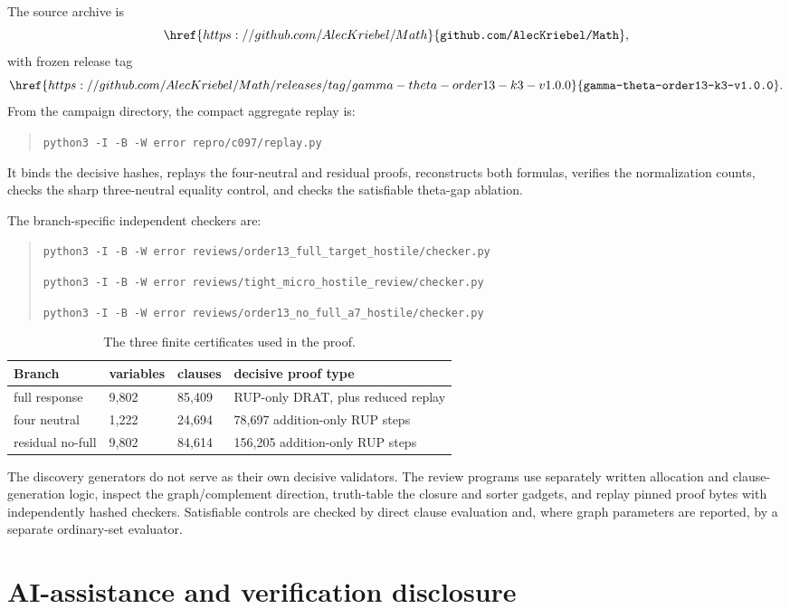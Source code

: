 \documentclass[11pt]{article}
\theoremstyle{definition}
\theoremstyle{remark}
\begin{document}
The source archive is
\[
\href{https://github.com/AlecKriebel/Math}
     {\texttt{github.com/AlecKriebel/Math}},
\]
with frozen release tag
\[
\href{https://github.com/AlecKriebel/Math/releases/tag/gamma-theta-order13-k3-v1.0.0}
     {\texttt{gamma-theta-order13-k3-v1.0.0}}.
\]
From the campaign directory, the compact aggregate replay is:
\begin{quote}
\small
\texttt{python3 -I -B -W error repro/c097/replay.py}
\end{quote}
It binds the decisive hashes, replays the four-neutral and residual proofs,
reconstructs both formulas, verifies the normalization counts, checks the
sharp three-neutral equality control, and checks the satisfiable
theta-gap ablation.

The branch-specific independent checkers are:
\begin{quote}
\small
\texttt{python3 -I -B -W error reviews/order13\_full\_target\_hostile/checker.py}

\texttt{python3 -I -B -W error reviews/tight\_micro\_hostile\_review/checker.py}

\texttt{python3 -I -B -W error reviews/order13\_no\_full\_a7\_hostile/checker.py}
\end{quote}

\begin{table}[ht]
\centering
\small
\begin{tabular}{llll}
\toprule
Branch & variables & clauses & decisive proof type\\
\midrule
full response & 9,802 & 85,409 & RUP-only DRAT, plus reduced replay\\
four neutral & 1,222 & 24,694 & 78,697 addition-only RUP steps\\
residual no-full & 9,802 & 84,614 & 156,205 addition-only RUP steps\\
\bottomrule
\end{tabular}
\caption{The three finite certificates used in the proof.}
\end{table}

The discovery generators do not serve as their own decisive validators.
The review programs use separately written allocation and clause-generation
logic, inspect the graph/complement direction, truth-table the closure and
sorter gadgets, and replay pinned proof bytes with independently hashed
checkers.  Satisfiable controls are checked by direct clause evaluation and,
where graph parameters are reported, by a separate ordinary-set evaluator.

\section*{AI-assistance and verification disclosure}
\end{document}
